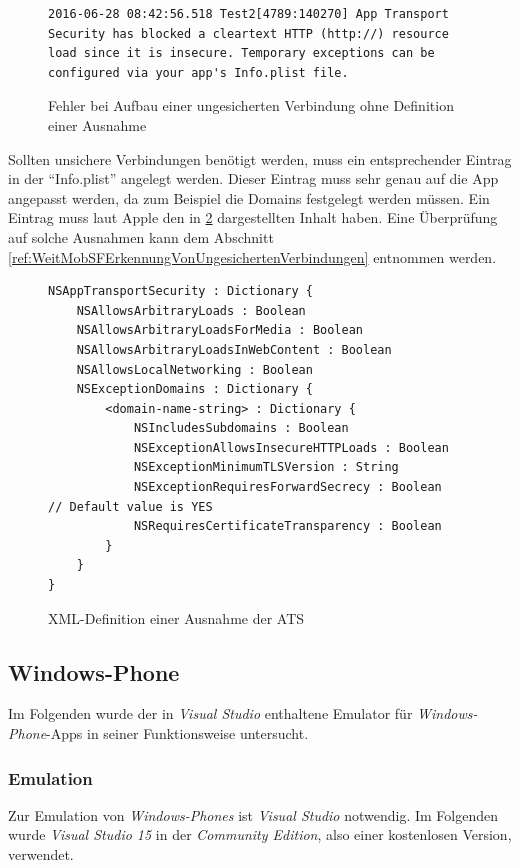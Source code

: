 \begin{figure}[p]
\begin{lstlisting}
2016-06-28 08:42:56.518 Test2[4789:140270] App Transport Security has blocked a cleartext HTTP (http://) resource load since it is insecure. Temporary exceptions can be configured via your app's Info.plist file.
\end{lstlisting}
\caption{Fehler bei Aufbau einer ungesicherten Verbindung ohne Definition einer Ausnahme}
\label{lst:VergliOSTLSFehler}
\end{figure}

Sollten unsichere Verbindungen benötigt werden, muss ein entsprechender Eintrag in der "`Info.plist"' angelegt werden. Dieser Eintrag muss sehr genau auf die App angepasst werden, da zum Beispiel die Domains festgelegt werden müssen. Ein Eintrag muss laut Apple\cite{AppleNSAppTransportSecurity} den in \ref{lst:VergliOSATSAus} dargestellten Inhalt haben. Eine Überprüfung auf solche Ausnahmen kann dem Abschnitt \ref{ref:WeitMobSFErkennungVonUngesichertenVerbindungen} entnommen werden.

\begin{figure}
\begin{lstlisting}
NSAppTransportSecurity : Dictionary {
    NSAllowsArbitraryLoads : Boolean
    NSAllowsArbitraryLoadsForMedia : Boolean
    NSAllowsArbitraryLoadsInWebContent : Boolean
    NSAllowsLocalNetworking : Boolean
    NSExceptionDomains : Dictionary {
        <domain-name-string> : Dictionary {
            NSIncludesSubdomains : Boolean
            NSExceptionAllowsInsecureHTTPLoads : Boolean
            NSExceptionMinimumTLSVersion : String
            NSExceptionRequiresForwardSecrecy : Boolean   // Default value is YES
            NSRequiresCertificateTransparency : Boolean
        }
    }
}
\end{lstlisting}
\caption{XML-Definition einer Ausnahme der ATS}
\label{lst:VergliOSATSAus}
\end{figure}

		\subsection{Windows-Phone}
		Im Folgenden wurde der in \textit{Visual Studio} enthaltene Emulator für \textit{Windows-Phone}-Apps in seiner Funktionsweise untersucht.
		
			\subsubsection{Emulation}
			Zur Emulation von \textit{Windows-Phones} ist \textit{Visual Studio} notwendig. Im Folgenden wurde \textit{Visual Studio 15} in der \textit{Community Edition}, also einer kostenlosen Version, verwendet.\\
			
